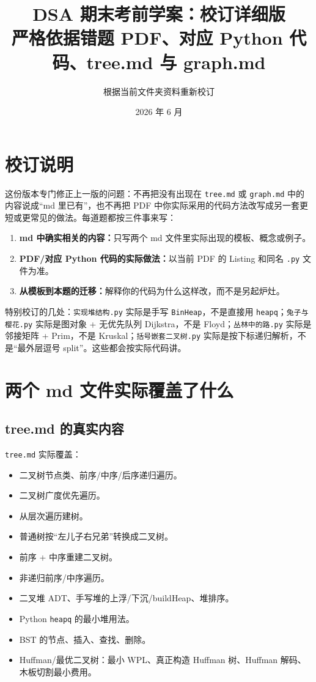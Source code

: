 \documentclass[10pt,a4paper,fontset=none]{ctexart}
\title{\bfseries DSA 期末考前学案：校订详细版\\\large 严格依据错题 PDF、对应 Python 代码、tree.md 与 graph.md}
\author{根据当前文件夹资料重新校订}
\date{2026 年 6 月}
\begin{document}
\maketitle
\tableofcontents
\newpage

\section*{校订说明}
这份版本专门修正上一版的问题：不再把没有出现在 \texttt{tree.md} 或 \texttt{graph.md} 中的内容说成“md 里已有”，也不再把 PDF 中你实际采用的代码方法改写成另一套更短或更常见的做法。每道题都按三件事来写：
\begin{enumerate}
  \item \textbf{md 中确实相关的内容：}只写两个 md 文件里实际出现的模板、概念或例子。
  \item \textbf{PDF/对应 Python 代码的实际做法：}以当前 PDF 的 Listing 和同名 \texttt{.py} 文件为准。
  \item \textbf{从模板到本题的迁移：}解释你的代码为什么这样改，而不是另起炉灶。
\end{enumerate}

\begin{warnbox}
特别校订的几处：\texttt{实现堆结构.py} 实际是手写 \texttt{BinHeap}，不是直接用 \texttt{heapq}；\texttt{兔子与樱花.py} 实际是图对象 + 无优先队列 Dijkstra，不是 Floyd；\texttt{丛林中的路.py} 实际是邻接矩阵 + Prim，不是 Kruskal；\texttt{括号嵌套二叉树.py} 实际是按下标递归解析，不是“最外层逗号 split”。这些都会按实际代码讲。
\end{warnbox}

\section{两个 md 文件实际覆盖了什么}

\subsection{tree.md 的真实内容}
\begin{sourcebox}
\texttt{tree.md} 实际覆盖：
\begin{itemize}
  \item 二叉树节点类、前序/中序/后序递归遍历。
  \item 二叉树广度优先遍历。
  \item 从层次遍历建树。
  \item 普通树按“左儿子右兄弟”转换成二叉树。
  \item 前序 + 中序重建二叉树。
  \item 非递归前序/中序遍历。
  \item 二叉堆 ADT、手写堆的上浮/下沉/buildHeap、堆排序。
  \item Python \texttt{heapq} 的最小堆用法。
  \item BST 的节点、插入、查找、删除。
  \item Huffman/最优二叉树：最小 WPL、真正构造 Huffman 树、Huffman 解码、木板切割最小费用。
\end{itemize}
\end{sourcebox}
\end{document}
